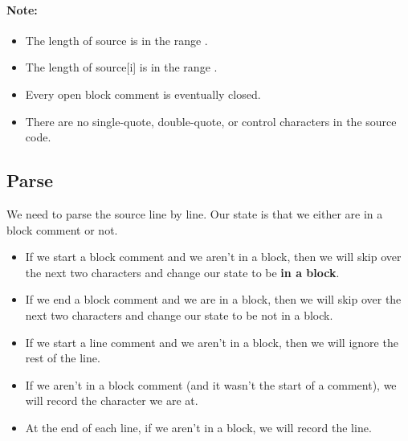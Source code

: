 \paragraph{Note:}
\begin{itemize}
\item The length of source is in the range \fcc{[1, 100]}.
\item The length of source[i] is in the range \fcc{[0, 80]}.
\item Every open block comment is eventually closed.
\item There are no single-quote, double-quote, or control characters in the source code.
\end{itemize}

\subsection{Parse}
We need to parse the source line by line. Our state is that we either are in a block comment or not.

\begin{itemize}
\item If we start a block comment and we aren't in a block, then we will skip over the next two characters and change our state to be \textbf{in a block}.
\item If we end a block comment and we are in a block, then we will skip over the next two characters and change our state to be not in a block.
\item If we start a line comment and we aren't in a block, then we will ignore the rest of the line.
\item If we aren't in a block comment (and it wasn't the start of a comment), we will record the character we are at.
\item At the end of each line, if we aren't in a block, we will record the line.
\end{itemize}

